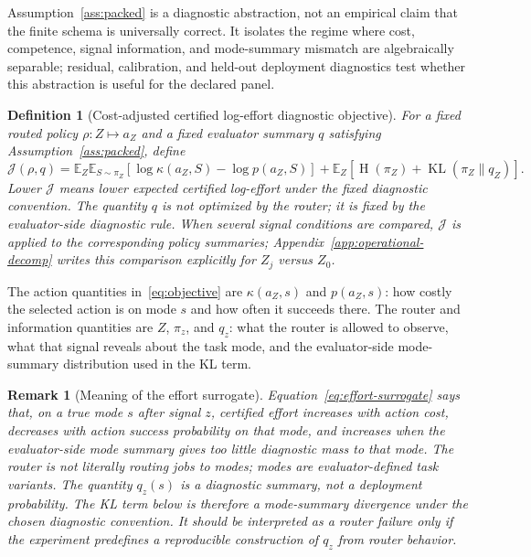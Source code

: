 \documentclass{article}
\newtheorem{definition}{Definition}
\newtheorem{remark}{Remark}
\DeclareMathOperator{\KL}{KL}
\DeclareMathOperator{\Hent}{H}
\newcommand{\E}{\mathbb{E}}
\newcommand{\J}{\mathcal{J}}
\begin{document}
Assumption~\ref{ass:packed} is a diagnostic abstraction, not an empirical claim that the finite schema is universally correct.
It isolates the regime where cost, competence, signal information, and mode-summary mismatch are algebraically separable; residual, calibration, and held-out deployment diagnostics test whether this abstraction is useful for the declared panel.

\begin{definition}[Cost-adjusted certified log-effort diagnostic objective]
\label{def:objective}
For a fixed routed policy $\rho:Z\mapsto a_Z$ and a fixed evaluator summary $q$ satisfying Assumption~\ref{ass:packed}, define
\begin{equation}
  \J(\rho,q)
  =
  \E_Z\E_{S\sim\pi_Z}\!\left[
    \log \kappa(a_Z,S)-\log p(a_Z,S)
  \right]
  + \E_{Z}\!\left[
      \Hent(\pi_{Z})
      + \KL(\pi_{Z}\|q_{Z})
    \right].
  \label{eq:objective}
\end{equation}
Lower $\J$ means lower expected certified log-effort under the fixed diagnostic convention.
The quantity $q$ is not optimized by the router; it is fixed by the evaluator-side diagnostic rule.
When several signal conditions are compared, $\J$ is applied to the corresponding policy summaries; Appendix~\ref{app:operational-decomp} writes this comparison explicitly for $Z_j$ versus $Z_0$.
\end{definition}

The action quantities in~\eqref{eq:objective} are $\kappa(a_Z,s)$ and $p(a_Z,s)$: how costly the selected action is on mode $s$ and how often it succeeds there.
The router and information quantities are $Z$, $\pi_z$, and $q_z$: what the router is allowed to observe, what that signal reveals about the task mode, and the evaluator-side mode-summary distribution used in the KL term.

\begin{remark}[Meaning of the effort surrogate]
\label{rem:effort-surrogate}
Equation~\eqref{eq:effort-surrogate} says that, on a true mode $s$ after signal $z$, certified effort increases with action cost, decreases with action success probability on that mode, and increases when the evaluator-side mode summary gives too little diagnostic mass to that mode.
The router is not literally routing jobs to modes; modes are evaluator-defined task variants.
The quantity $q_z(s)$ is a diagnostic summary, not a deployment probability.
The KL term below is therefore a mode-summary divergence under the chosen diagnostic convention.
It should be interpreted as a router failure only if the experiment predefines a reproducible construction of $q_z$ from router behavior.
\end{remark}
\end{document}

